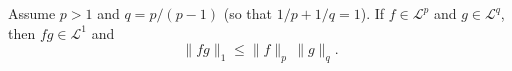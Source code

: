 Assume $p > 1$ and $q = p/(p-1)$ (so that $1/p + 1/q = 1$). If $f \in \mathcal{L}^p$ and $g \in \mathcal{L}^q$, then $fg \in \mathcal{L}^1$ and
$$\|fg\|_1 \leq \|f\|_p \, \|g\|_q.$$
